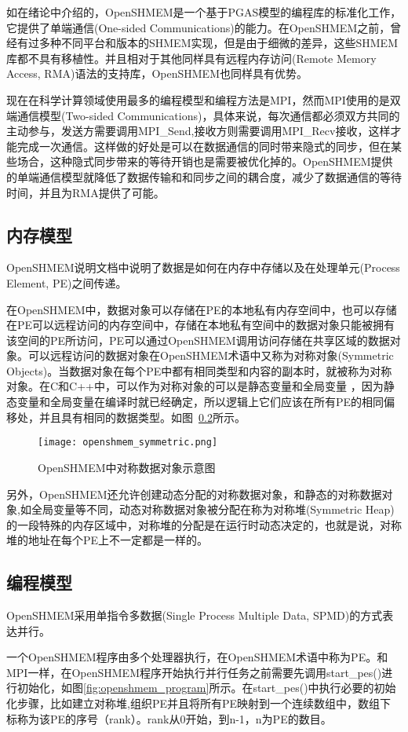如在绪论中介绍的，OpenSHMEM是一个基于PGAS模型的编程库的标准化工作，它提供了单端通信(One-sided Communications)的能力。在OpenSHMEM之前，曾经有过多种不同平台和版本的SHMEM实现，但是由于细微的差异，这些SHMEM库都不具有移植性。并且相对于其他同样具有远程内存访问(Remote Memory Access, RMA)语法的支持库，OpenSHMEM也同样具有优势。

现在在科学计算领域使用最多的编程模型和编程方法是MPI，然而MPI使用的是双端通信模型(Two-sided Communications)，具体来说，每次通信都必须双方共同的主动参与，发送方需要调用MPI\_Send,接收方则需要调用MPI\_Recv接收，这样才能完成一次通信。这样做的好处是可以在数据通信的同时带来隐式的同步，但在某些场合，这种隐式同步带来的等待开销也是需要被优化掉的。OpenSHMEM提供的单端通信模型就降低了数据传输和和同步之间的耦合度，减少了数据通信的等待时间，并且为RMA提供了可能。

\subsection{内存模型}\label{sec:openshmem_mem}
OpenSHMEM说明文档中说明了数据是如何在内存中存储以及在处理单元(Process Element, PE)之间传递。

在OpenSHMEM中，数据对象可以存储在PE的本地私有内存空间中，也可以存储在PE可以远程访问的内存空间中，存储在本地私有空间中的数据对象只能被拥有该空间的PE所访问，PE可以通过OpenSHMEM调用访问存储在共享区域的数据对象。可以远程访问的数据对象在OpenSHMEM术语中又称为对称对象(Symmetric Objects)。当数据对象在每个PE中都有相同类型和内容的副本时，就被称为对称对象。在C和C++中，可以作为对称对象的可以是静态变量和全局变量 ，因为静态变量和全局变量在编译时就已经确定，所以逻辑上它们应该在所有PE的相同偏移处，并且具有相同的数据类型。如图~\ref{}所示。
\begin{figure}
\centering
\texttt{[image: openshmem\_symmetric.png]}
\caption{OpenSHMEM中对称数据对象示意图}\label{fig:symmetric}
\end{figure}
另外，OpenSHMEM还允许创建动态分配的对称数据对象，和静态的对称数据对象,如全局变量等不同，动态对称数据对象被分配在称为对称堆(Symmetric Heap)的一段特殊的内存区域中，对称堆的分配是在运行时动态决定的，也就是说，对称堆的地址在每个PE上不一定都是一样的。
\subsection{编程模型}
OpenSHMEM采用单指令多数据(Single Process Multiple Data, SPMD)的方式表达并行。

一个OpenSHMEM程序由多个处理器执行，在OpenSHMEM术语中称为PE。和MPI一样，在OpenSHMEM程序开始执行并行任务之前需要先调用start\_pes()进行初始化，如图\ref{fig:openshmem_program}所示。在start\_pes()中执行必要的初始化步骤，比如建立对称堆,组织PE并且将所有PE映射到一个连续数组中，数组下标称为该PE的序号（rank）。rank从0开始，到n-1，n为PE的数目。

